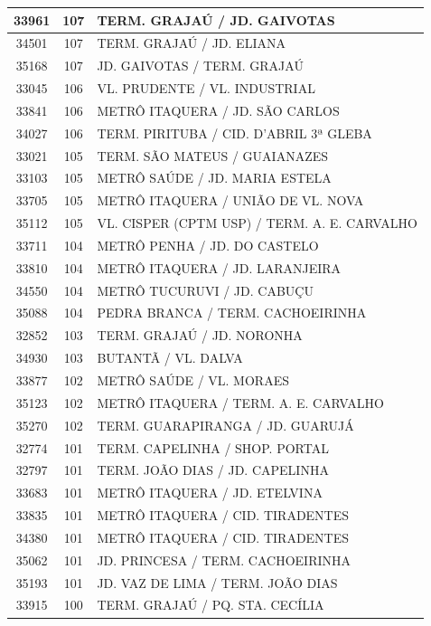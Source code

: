 \documentclass[
	12pt,				%
	oneside,			%
	a4paper,			%
	english,			%
	brazil				%
	]{abntex2ppgsi}
\begin{document}
{{\begin{apendicesenv}
\begin{longtable}{c|c|p{7cm}}
 \hline 
33961 &	107 &	TERM. GRAJAÚ / JD. GAIVOTAS \\ 
 \hline 
34501 &	107 &	TERM. GRAJAÚ / JD. ELIANA \\ 
 \hline 
35168 &	107 &	JD. GAIVOTAS / TERM. GRAJAÚ \\ 
 \hline 
33045 &	106 &	VL. PRUDENTE / VL. INDUSTRIAL \\ 
 \hline 
33841 &	106 &	METRÔ ITAQUERA / JD. SÃO CARLOS \\ 
 \hline 
34027 &	106 &	TERM. PIRITUBA / CID. D'ABRIL 3ª GLEBA \\ 
 \hline 
33021 &	105 &	TERM. SÃO MATEUS / GUAIANAZES \\ 
 \hline 
33103 &	105 &	METRÔ SAÚDE / JD. MARIA ESTELA \\ 
 \hline 
33705 &	105 &	METRÔ ITAQUERA / UNIÃO DE VL. NOVA \\ 
 \hline 
35112 &	105 &	VL. CISPER (CPTM USP) / TERM. A. E. CARVALHO \\ 
 \hline 
33711 &	104 &	METRÔ PENHA / JD. DO CASTELO \\ 
 \hline 
33810 &	104 &	METRÔ ITAQUERA / JD. LARANJEIRA \\ 
 \hline 
34550 &	104 &	METRÔ TUCURUVI / JD. CABUÇU \\ 
 \hline 
35088 &	104 &	PEDRA BRANCA / TERM. CACHOEIRINHA \\ 
 \hline 
32852 &	103 &	TERM. GRAJAÚ / JD. NORONHA \\ 
 \hline 
34930 &	103 &	BUTANTÃ / VL. DALVA \\ 
 \hline 
33877 &	102 &	METRÔ SAÚDE / VL. MORAES \\ 
 \hline 
35123 &	102 &	METRÔ ITAQUERA / TERM. A. E. CARVALHO \\ 
 \hline 
35270 &	102 &	TERM. GUARAPIRANGA / JD. GUARUJÁ \\ 
 \hline 
32774 &	101 &	TERM. CAPELINHA / SHOP. PORTAL \\ 
 \hline 
32797 &	101 &	TERM. JOÃO DIAS / JD. CAPELINHA \\ 
 \hline 
33683 &	101 &	METRÔ ITAQUERA / JD. ETELVINA \\ 
 \hline 
33835 &	101 &	METRÔ ITAQUERA / CID. TIRADENTES \\ 
 \hline 
34380 &	101 &	METRÔ ITAQUERA / CID. TIRADENTES \\ 
 \hline 
35062 &	101 &	JD. PRINCESA / TERM. CACHOEIRINHA \\ 
 \hline 
35193 &	101 &	JD. VAZ DE LIMA / TERM. JOÃO DIAS \\ 
 \hline 
33915 &	100 &	TERM. GRAJAÚ / PQ. STA. CECÍLIA \\ 

\end{longtable}
\end{apendicesenv}}}
\end{document}
